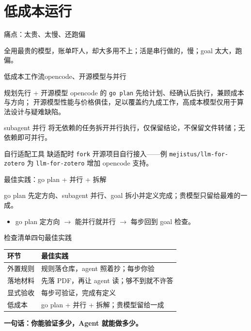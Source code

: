 \documentclass[aspectratio=169]{beamer}
\begin{document}
\section[低成本]{低成本运行}

\begin{frame}{\textcolor{hot}{痛点}：太贵、太慢、还跑偏}
  \begin{alertblock}{}
    全用最贵的模型，账单吓人，却大多用不上；活是串行做的，慢；goal 太大，跑偏。
  \end{alertblock}
\end{frame}

\begin{frame}{低成本工作流}{opencode、开源模型与并行}
  \begin{block}{规划先行 + 开源模型}
    opencode 的 \texttt{go plan} 先给计划、经确认后执行，兼顾成本与方向；
    开源模型性能与价格俱佳，足以覆盖约九成工作，高成本模型仅用于算法设计与疑难缺陷。
  \end{block}
  \begin{block}{subagent 并行}
    将无依赖的任务拆开并行执行，仅保留结论，不保留文件转储；无依赖即可并行。
  \end{block}
  \begin{block}{自行适配工具}
    缺适配时 \texttt{fork} 开源项目自行接入——例 \texttt{mejistus/llm-for-zotero}
    为 \texttt{llm-for-zotero} 增加 opencode 支持。
  \end{block}
\end{frame}

\begin{frame}{\textcolor{video}{最佳实践}：go plan + 并行 + 拆解}
  \begin{exampleblock}{}
    go plan 先定方向、subagent 并行、goal 拆小并定义完成；贵模型只留给最难的一成。
  \end{exampleblock}
  \bigskip
  \begin{itemize}
    \item go plan 定方向 $\to$ 能并行就并行 $\to$ 每步回到 goal 检查。
  \end{itemize}
\end{frame}

\begin{frame}{检查清单}{四句最佳实践}
  \begin{center}
  \footnotesize
  \begin{tabular}{ll}
    \toprule
    \textbf{环节} & \textbf{最佳实践} \\
    \midrule
    \textcolor{sig}{外置规则} & 规则落仓库，agent 照着抄；每步你验 \\
    \textcolor{accent}{落地材料} & 先落 PDF，再让 agent 读；够不到就不许答 \\
    \textcolor{video}{显式验收} & 每步可验证，完成有定义 \\
    \textcolor{hot}{低成本} & go plan + 并行 + 拆解；贵模型留给一成 \\
    \bottomrule
  \end{tabular}
  \end{center}
  \bigskip
  \begin{center}
  \textbf{一句话：你能验证多少，Agent 就能做多少。}
  \end{center}
\end{frame}
\end{document}
